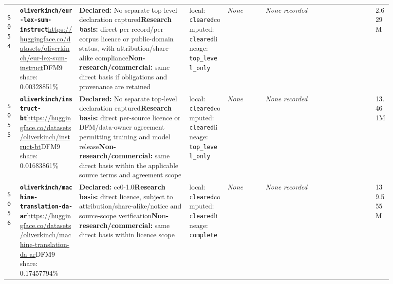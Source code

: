 \documentclass[9pt,a4paper]{article}
\newcommand{\srcid}[1]{\hypertarget{src:#1}{\texttt{#1}}}
\begin{document}
\begin{landscape}
\begin{longtable}{@{}L{0.03\linewidth}L{0.14\linewidth}L{0.26\linewidth}L{0.09\linewidth}L{0.09\linewidth}L{0.265\linewidth}L{0.045\linewidth}@{}}
\srcid{S054} & \textbf{\nolinkurl{oliverkinch/eur-lex-sum-instruct}}\newline \url{https://huggingface.co/datasets/oliverkinch/eur-lex-sum-instruct}\newline DFM9 share: 0.00328851\% & \textbf{Declared:} No separate top-level declaration captured\newline \textbf{Research basis:} direct per-record/per-corpus licence or public-domain status, with attribution/share-alike compliance\newline \textbf{Non-research/commercial:} same direct basis if obligations and provenance are retained & local: \texttt{cleared}\newline computed: \texttt{cleared}\newline lineage: \texttt{top\_level\_only} & \textit{None} & \textit{None recorded} & 2.629M \\
\srcid{S055} & \textbf{\nolinkurl{oliverkinch/instruct-bt}}\newline \url{https://huggingface.co/datasets/oliverkinch/instruct-bt}\newline DFM9 share: 0.01683861\% & \textbf{Declared:} No separate top-level declaration captured\newline \textbf{Research basis:} direct per-source licence or DFM/data-owner agreement permitting training and model release\newline \textbf{Non-research/commercial:} same direct basis within the applicable source terms and agreement scope & local: \texttt{cleared}\newline computed: \texttt{cleared}\newline lineage: \texttt{top\_level\_only} & \textit{None} & \textit{None recorded} & 13.461M \\
\srcid{S056} & \textbf{\nolinkurl{oliverkinch/machine-translation-da-ar}}\newline \url{https://huggingface.co/datasets/oliverkinch/machine-translation-da-ar}\newline DFM9 share: 0.17457794\% & \textbf{Declared:} cc0-1.0\newline \textbf{Research basis:} direct licence, subject to attribution/share-alike/notice and source-scope verification\newline \textbf{Non-research/commercial:} same direct basis within licence scope & local: \texttt{cleared}\newline computed: \texttt{cleared}\newline lineage: \texttt{complete} & \textit{None} & \textit{None recorded} & 139.555M \\

\end{longtable}
\end{landscape}
\end{document}
